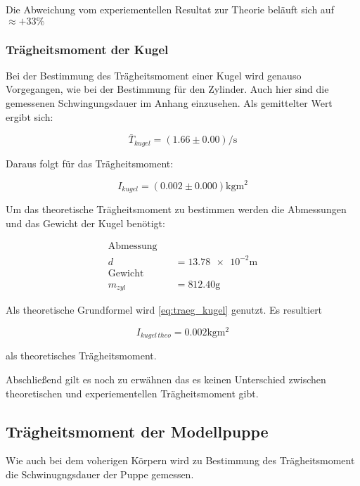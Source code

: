 Die Abweichung vom experiementellen Resultat zur Theorie beläuft sich auf $\approx +33 \%$

\subsubsection{Trägheitsmoment der Kugel}

Bei der Bestimmung des Trägheitsmoment einer Kugel wird genauso Vorgegangen, wie bei 
der Bestimmung für den Zylinder. Auch hier sind die gemessenen Schwingungsdauer im Anhang einzusehen.
Als gemittelter Wert ergibt sich:

\begin{equation*}
\bar{T}_{kugel}=\left(\num{1.66}\pm\num{0.00}\right) \si{\per\second}
\end{equation*}

Daraus folgt für das Trägheitsmoment:

\begin{equation}
\label{eq:traeg_kugel_exp}
I_{kugel}=\left(\num{0.002}\pm\num{0.000}\right) \si{\kilogram\meter\squared}
\end{equation}

Um das theoretische Trägheitsmoment zu bestimmen werden die Abmessungen und das Gewicht der Kugel benötigt:

\begin{align*}
\text{Abmessung} \quad &\\
d&=\num{13.78e-2}\si{\meter}\\
\text{Gewicht} \quad &\\
m_{zyl}&=\num{812.40}\si{\gram}
\end{align*}

Als theoretische Grundformel wird \eqref{eq:traeg_kugel} genutzt.
Es resultiert 

\begin{equation}
\label{eq:traeg_kugel_theo}
I_{kugel \,theo}= \num{0.002}\si{\kilogram\meter\squared}
\end{equation}

als theoretisches Trägheitsmoment.

Abschließend gilt es noch zu erwähnen das es keinen Unterschied
zwischen theoretischen und experiementellen Trägheitsmoment gibt.

\subsection{Trägheitsmoment der Modellpuppe}

Wie auch bei dem voherigen Körpern wird zu Bestimmung des Trägheitsmoment
die Schwinugngsdauer der Puppe gemessen.

